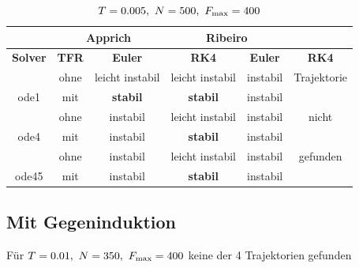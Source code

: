\begin{table}[htbp]
	\centering
		\begin{tabular}{c|c|c|c|c|c}
			\rowcolor[gray]{0.9}
			\multicolumn{2}{c|}{\textbf{Simulation}} & \multicolumn{2}{c|}{\textbf{Apprich}} & \multicolumn{2}{c}{\textbf{Ribeiro}} \\
			\midrule
			\rowcolor[gray]{0.9}
			\textbf{Solver} & \textbf{TFR} & \textbf{Euler} & \textbf{RK4} & \textbf{Euler} & \textbf{RK4} \\
			\midrule
			\cellcolor[gray]{0.9}  											& \cellcolor[gray]{.9}ohne & leicht instabil  & leicht instabil & instabil & Trajektorie\\
			\multirow{-2}{*}{\cellcolor[gray]{.9}ode1}	& \cellcolor[gray]{.9}mit  & \textbf{stabil} & \textbf{stabil} 			& instabil 				 & 	\\
			\midrule
			\cellcolor[gray]{0.9}  											& \cellcolor[gray]{.9}ohne & instabil	& leicht instabil & instabil & nicht\\
			\multirow{-2}{*}{\cellcolor[gray]{.9}ode4}	& \cellcolor[gray]{.9}mit  & instabil & \textbf{stabil} & instabil & \\
			\midrule	
			\cellcolor[gray]{0.9}  											& \cellcolor[gray]{.9}ohne & instabil	&  leicht instabil & instabil 	& gefunden\\
			\multirow{-2}{*}{\cellcolor[gray]{.9}ode45}	& \cellcolor[gray]{.9}mit  & instabil	&  \textbf{stabil}  & instabil 	& \																											
		\end{tabular}
	\caption{$T=0.005, \ N=500, \ F_{\mrm{max}}=400$}
	\label{tab:T0005N500Fmax400}
\end{table}





\subsection{Mit Gegeninduktion}

Für $T=0.01, \ N=350, \ F_{\mrm{max}}=400$ keine der 4 Trajektorien gefunden

